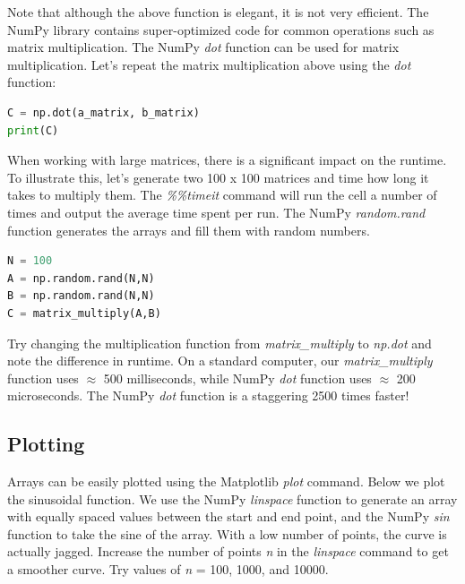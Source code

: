 \documentclass[a4paper , 12pt]{book}
\begin{document}
Note that although the above function is elegant, it is not very efficient. The NumPy library contains super-optimized code for common operations such as matrix multiplication. The NumPy \textit{dot} function can be used for matrix multiplication. Let's repeat the matrix multiplication above using the \textit{dot} function:

\begin{center}
\begin{lstlisting}[language=Python, frame=single]
C = np.dot(a_matrix, b_matrix)
print(C)
\end{lstlisting}
\end{center}

When working with large matrices, there is a significant impact on the runtime. To illustrate this, let's generate two 100 x 100 matrices and time how long it takes to multiply them. The \textit{\%\%timeit} command will run the cell a number of times and output the average time spent per run. The NumPy \textit{random.rand} function generates the arrays and fill them with random numbers.

\begin{center}
\begin{lstlisting}[language=Python, frame=single]
%%timeit
N = 100
A = np.random.rand(N,N)
B = np.random.rand(N,N)
C = matrix_multiply(A,B)
\end{lstlisting}
\end{center}

Try changing the multiplication function from \textit{matrix\_multiply} to \textit{np.dot} and note the difference in runtime. On a standard computer, our \textit{matrix\_multiply} function uses $\approx$ 500 milliseconds, while NumPy \textit{dot} function uses $\approx$ 200 microseconds. The NumPy \textit{dot} function is a staggering 2500 times faster!

\subsection{Plotting}

Arrays can be easily plotted using the Matplotlib \textit{plot} command. Below we plot the sinusoidal function. We use the NumPy \textit{linspace} function to generate an array with equally spaced values between the start and end point, and the NumPy \textit{sin} function to take the sine of the array. With a low number of points, the curve is actually jagged. Increase the number of points \textit{n} in the \textit{linspace} command to get a smoother curve. Try values of \textit{n} = 100, 1000, and 10000.
\end{document}
